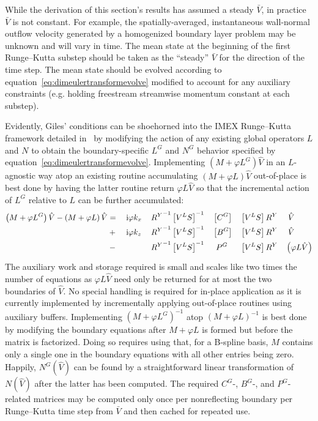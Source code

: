 While the derivation of this section's results has assumed a steady $\bar{V}$,
in practice $\bar{V}$ is not constant.  For example, the spatially-averaged,
instantaneous wall-normal outflow velocity generated by a homogenized boundary
layer problem may be unknown and will vary in time.  The mean state at the
beginning of the first Runge--Kutta substep should be taken as the ``steady''
$\bar{V}$ for the direction of the time step.  The mean state should be evolved
according to equation~\eqref{eq:dimeulertransformevolve} modified to account
for any auxiliary constraints (e.g. holding freestream streamwise momentum
constant at each substep).

Evidently, Giles' conditions can be shoehorned into the IMEX
Runge--Kutta framework detailed in~\cite{Ulerich_SZPerfect} by
modifying the action of any existing global operators $L$ and $N$ to
obtain the boundary-specific $L^G$ and $N^G$ behavior specified by
equation~\eqref{eq:dimeulertransformevolve}.  Implementing
$\left(M+\varphi{}L^G\right)\hat{V}$ in an $L$-agnostic way atop an
existing routine accumulating $\left(M+\varphi{}L\right)\hat{V}$
out-of-place is best done by having the latter routine return
$\varphi{}L\hat{V}$ so that the incremental action of $L^G$ relative
to $L$ can be further accumulated:
\begin{alignat}{10}
\left(M+\varphi{}L^G\right)\hat{V} - \left(M+\varphi{}L\right)\hat{V}
  &={}   &&\ii \varphi{} k_x \, &&{R^Y}^{-1} \left[V^L S\right]^{-1} &&\left[C^G\right]                    &&\left[V^L S\right] {R^Y} &&\,\,\hat{V} \\
  &{}+{} &&\ii \varphi{} k_z    &&{R^Y}^{-1} \left[V^L S\right]^{-1} &&\left[B^G\right]                    &&\left[V^L S\right] {R^Y} &&\,\,\hat{V} \\
  &{}-{} &&                     &&{R^Y}^{-1} \left[V^L S\right]^{-1} &&\phantom{\Bigl[}P^G\phantom{\Bigr]} &&\left[V^L S\right] {R^Y} &&\left(\varphi{}L\hat{V}\right)
\end{alignat}
The auxiliary work and storage required is small and scales like two times the
number of equations as $\varphi{}L\hat{V}$ need only be returned for at most
the two boundaries of $\hat{V}$.  No special handling is required for in-place
application as it is currently implemented by incrementally applying
out-of-place routines using auxiliary buffers.  Implementing
$\left(M+\varphi{}L^G\right)^{-1}$ atop $\left(M+\varphi{}L\right)^{-1}$ is
best done by modifying the boundary equations after $M+\varphi{}L$ is formed
but before the matrix is factorized.  Doing so requires using that, for a
B-spline basis, $M$ contains only a single one in the boundary equations with
all other entries being zero.  Happily, $N^G(\hat{V})$ can be found by a
straightforward linear transformation of $N(\hat{V})$ after the latter has been
computed.  The required $C^G$-, $B^G$-, and $P^G$-related matrices may be
computed only once per nonreflecting boundary per Runge--Kutta time step from
$\bar{V}$ and then cached for repeated use.

